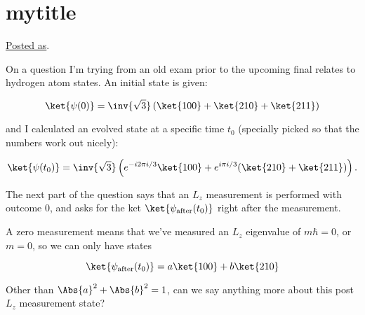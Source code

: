 
%

\chapter{mytitle}

\beginArtNoToc

\href{http://www.physicsforums.com/showthread.php?p=3038801#post3038801}{Posted as}.

On a question I'm trying from an old exam prior to the upcoming final relates to hydrogen atom states.  An initial state is given:

\begin{equation*}
\ket{\psi(0)} = \inv{\sqrt{3}} \left( 
\ket{100} + \ket{210} + \ket{211}
\right)
\end{equation*}

and I calculated an evolved state at a specific time $t_0$ (specially picked so that the numbers work out nicely):

\begin{equation*}
\ket{\psi(t_0)} = \inv{\sqrt{3}} \left( 
e^{-i2\pi i/3} \ket{100} + 
e^{i\pi i/3} (
\ket{210} + \ket{211} )
\right).
\end{equation*}

The next part of the question says that an $L_z$ measurement is performed with outcome 0, and asks for the ket $\ket{\psi_{\text{after}}(t_0)}$ right after the measurement.

A zero measurement means that we've measured an $L_z$ eigenvalue of $m \hbar = 0$, or $m = 0$, so we can only have states

\begin{equation*}
\ket{\psi_{\text{after}}(t_0)} = a \ket{100} + b \ket{210} 
\end{equation*}

Other than $\Abs{a}^2 + \Abs{b}^2 = 1$, can we say anything more about this post $L_z$ measurement state?

\EndNoBibArticle
